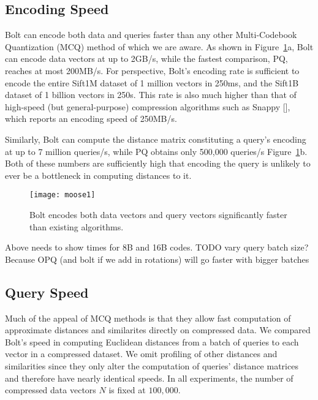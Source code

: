 \subsection{Encoding Speed}

Bolt can encode both data and queries faster than any other Multi-Codebook Quantization (MCQ) method of which we are aware. As shown in Figure~\ref{fig:encoding_speeds}a, Bolt can encode data vectors at up to 2GB/s, while the fastest comparison, PQ, reaches at most 200MB/s. For perspective, Bolt's encoding rate is sufficient to encode the entire Sift1M dataset of 1 million vectors in 250ms, and the Sift1B dataset of 1 billion vectors in 250s. This rate is also much higher than that of high-speed (but general-purpose) compression algorithms such as Snappy [], which reports an encoding speed of 250MB/s.

Similarly, Bolt can compute the distance matrix constituting a query's encoding at up to 7 million queries/s, while PQ obtains only 500,000 queries/s Figure~\ref{fig:encoding_speeds}b. Both of these numbers are sufficiently high that encoding the query is unlikely to ever be a bottleneck in computing distances to it.

\begin{figure}[h]
\begin{center}
\label{fig:encoding_speeds}
\texttt{[image: moose1]}
\vspace*{-1mm}
\caption{Bolt encodes both data vectors and query vectors significantly faster than existing algorithms.}
\end{center}
\end{figure}

Above needs to show times for 8B and 16B codes.
TODO vary query batch size? Because OPQ (and bolt if we add in rotations) will go faster with bigger batches


\subsection{Query Speed}

Much of the appeal of MCQ methods is that they allow fast computation of approximate distances and similarites directly on compressed data. We compared Bolt's speed in computing Euclidean distances from a batch of queries to each vector in a compressed dataset. We omit profiling of other distances and similarities since they only alter the computation of queries' distance matrices and therefore have nearly identical speeds. In all experiments, the number of compressed data vectors $N$ is fixed at $100,000$.

